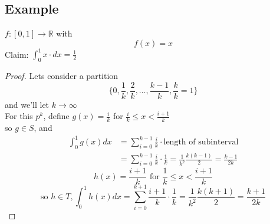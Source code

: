 \documentclass[12pt]{article}
\newcommand{\BR}{\mathbb R}
\begin{document}
\subsection*{Example}
$f:[0,1]\rightarrow\BR$ with \\
\[ f(x)=x \]
Claim: $\int_0^1x\cdot dx=\frac{1}{2}$ \\
\begin{proof}
  Lets consider a partition \\
  \[ \Big\{0,\frac{1}{k},\frac{2}{k},\dots,\frac{k-1}{k},\frac{k}{k}=1\Big\} \]
  and we'll let $k\rightarrow\infty$ \\
  For this $p^k$, define $g(x)=\frac{i}{k}$ for $\frac{i}{k}\leq x<\frac{i+1}{k}$ \\
  so $g\in S$, and \\
  \begin{align*}
    \int_0^1g(x)dx & = \sum_{i=0}^{k-1}\frac{i}{k}\cdot\text{length of subinterval} \\
    & = \sum_{i=0}^{k-1}\frac{i}{k}\cdot\frac{1}{k}=\frac{1}{k^2}\frac{k(k-1)}{2}=\frac{k-1}{2k}
  \end{align*}
  \[ h(x)=\frac{i+1}{k}\text{ for }\frac{1}{k}\leq x<\frac{i+1}{k} \]
  \[ \text{so } h\in T, \int_0^1h(x)dx=\sum_{i=0}^{k+1}\frac{i+1}{k}\cdot\frac{1}{k}=\frac{1}{k^2}\frac{k(k+1)}{2}=\frac{k+1}{2k} \]
\end{proof}
\end{document}
